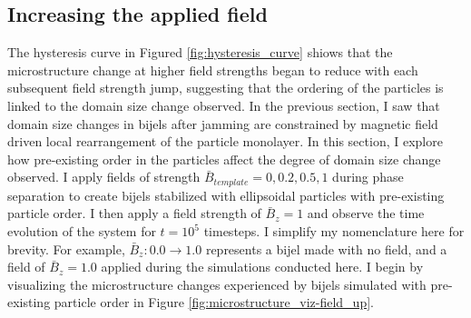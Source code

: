 \subsection{Increasing the applied
field}\label{increasing-the-applied-field}

The hysteresis curve in Figured \ref{fig:hysteresis_curve} shiows that the microstructure change at higher
field strengths began to reduce with each subsequent field strength
jump, suggesting that the ordering of the particles is linked to the
domain size change observed. In the previous section, I saw that domain
size changes in bijels after jamming are constrained by magnetic field
driven local rearrangement of the particle monolayer. In this section,
I explore how pre-existing order in the particles affect the degree of
domain size change observed. I apply fields of strength
$\bar{B}_{template} = 0, 0.2, 0.5, 1$ during phase separation to
create bijels stabilized with ellipsoidal particles with pre-existing
particle order. I then apply a field strength of $\bar{B}_z = 1$ and
observe the time evolution of the system for $t = 10^5$ timesteps. I
simplify my nomenclature here for brevity. For example,
$\bar{B}_z: 0.0 \rightarrow 1.0$ represents a bijel made with no
field, and a field of $\bar{B}_z = 1.0$ applied during the simulations conducted here. 
I begin by visualizing the microstructure
changes experienced by bijels simulated with pre-existing particle order
in Figure \ref{fig:microstructure_viz-field_up}.

